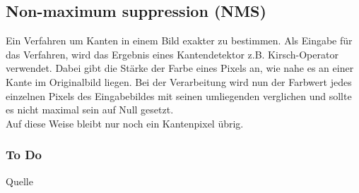 \subsection{Non-maximum suppression  (NMS)}
Ein Verfahren um Kanten in einem Bild exakter zu bestimmen. Als Eingabe für das Verfahren, wird das Ergebnis eines Kantendetektor z.B. Kirsch-Operator verwendet. Dabei gibt die Stärke der Farbe eines Pixels an, wie nahe es an einer Kante im Originalbild liegen. Bei der Verarbeitung wird nun der Farbwert jedes einzelnen Pixels des Eingabebildes mit seinen umliegenden verglichen und sollte es nicht maximal sein auf Null gesetzt.\\
Auf diese Weise bleibt nur noch ein Kantenpixel übrig.
\subsubsection{To Do}
Quelle